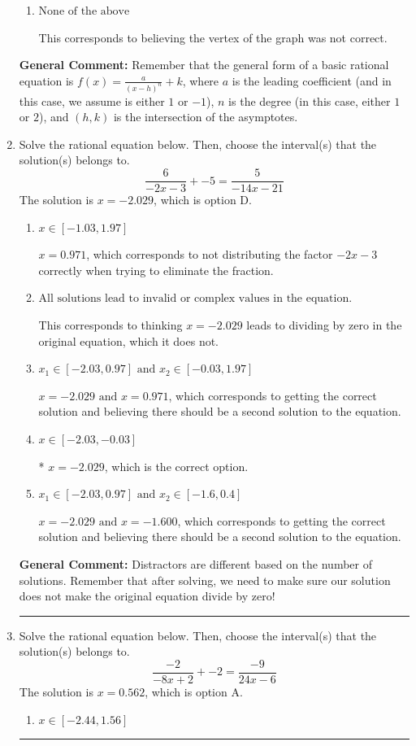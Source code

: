 \documentclass{extbook}[14pt]
\newcommand{\litem}[1]{\item #1

\rule{\textwidth}{0.4pt}}
\begin{document}
\begin{enumerate}
{\begin{enumerate}[label=\Alph*.]
Corresponds to using the general form $f(x) = \frac{a}{x+h}+k$ and the opposite leading coefficient.
\item \( \text{None of the above} \)

This corresponds to believing the vertex of the graph was not correct.
\end{enumerate}

\textbf{General Comment:} Remember that the general form of a basic rational equation is $ f(x) = \frac{a}{(x-h)^n} + k$, where $a$ is the leading coefficient (and in this case, we assume is either $1$ or $-1$), $n$ is the degree (in this case, either $1$ or $2$), and $(h, k)$ is the intersection of the asymptotes.
}
\litem{
Solve the rational equation below. Then, choose the interval(s) that the solution(s) belongs to.
\[ \frac{6}{-2x -3} + -5 = \frac{5}{-14x -21} \]The solution is \( x = -2.029 \), which is option D.\begin{enumerate}[label=\Alph*.]
\item \( x \in [-1.03,1.97] \)

$x = 0.971$, which corresponds to not distributing the factor $-2x -3$ correctly when trying to eliminate the fraction.
\item \( \text{All solutions lead to invalid or complex values in the equation.} \)

This corresponds to thinking $x = -2.029$ leads to dividing by zero in the original equation, which it does not.
\item \( x_1 \in [-2.03, 0.97] \text{ and } x_2 \in [-0.03,1.97] \)

$x = -2.029 \text{ and } x = 0.971$, which corresponds to getting the correct solution and believing there should be a second solution to the equation.
\item \( x \in [-2.03,-0.03] \)

* $x = -2.029$, which is the correct option.
\item \( x_1 \in [-2.03, 0.97] \text{ and } x_2 \in [-1.6,0.4] \)

$x = -2.029 \text{ and } x = -1.600$, which corresponds to getting the correct solution and believing there should be a second solution to the equation.
\end{enumerate}

\textbf{General Comment:} Distractors are different based on the number of solutions. Remember that after solving, we need to make sure our solution does not make the original equation divide by zero!
}
\litem{
Solve the rational equation below. Then, choose the interval(s) that the solution(s) belongs to.
\[ \frac{-2}{-8x + 2} + -2 = \frac{-9}{24x -6} \]The solution is \( x = 0.562 \), which is option A.\begin{enumerate}[label=\Alph*.]
\item \( x \in [-2.44,1.56] \)


\end{enumerate}}
\end{enumerate}
\end{document}
